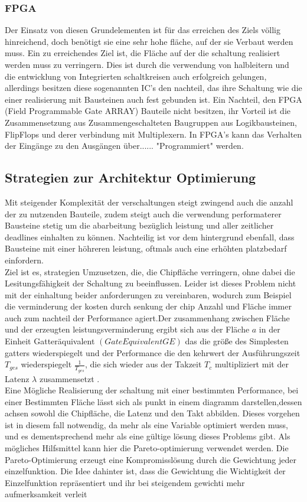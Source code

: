 \documentclass[conference]{IEEEtran}
\begin{document}
\subsubsection{FPGA}
Der Einsatz von diesen Grundelementen ist für das erreichen des Ziels völlig hinreichend, doch benötigt sie eine sehr hohe fläche, auf der sie Verbaut werden muss. Ein zu erreichendes Ziel ist, die Fläche auf der die schaltung realisiert werden muss zu verringern. Dies ist durch die verwendung von halbleitern und die entwicklung von Integrierten schaltkreisen auch erfolgreich gelungen, allerdings besitzen diese sogenannten IC's den nachteil, das ihre Schaltung wie die einer realisierung mit Bausteinen auch fest gebunden ist. Ein Nachteil, den FPGA (Field Programmable Gate ARRAY) Bauteile nicht besitzen, ihr Vorteil ist die Zusammensetzung aus Zusammengeschalteten Baugruppen aus Logikbausteinen, FlipFlops und derer verbindung mit Multiplexern. In FPGA's kann das Verhalten der Eingänge zu den Ausgängen über{\color{red}...... }"Programmiert" werden.
\subsection{Strategien zur Architektur Optimierung}
Mit steigender Komplexität der verschaltungen steigt zwingend auch die anzahl der  zu nutzenden Bauteile, zudem steigt auch die verwendung performaterer Bausteine stetig um die abarbeitung bezüglich leistung und aller zeitlicher deadlines einhalten zu können. Nachteilig ist vor dem hintergrund ebenfall, dass Bausteine mit einer höhreren leistung, oftmals auch eine erhöhten platzbedarf einfordern\cite[S.327]{2}.\\
Ziel ist es, strategien Umzusetzen, die,  die Chipfläche verringern, ohne dabei die Lesitungsfähigkeit der Schaltung zu beeinflussen. Leider ist dieses Problem nicht mit der einhaltung beider anforderungen zu vereinbaren, wodurch zum Beispiel die verminderung der kosten durch senkung der chip Anzahl und Fläche immer auch zum nachteil der Performance agiert.Der zusammenhang zwischen Fläche und der erzeugten leistungsverminderung ergibt sich aus der Fläche $a$ in der Einheit Gatteräquivalent $(Gate Equivalent GE)$ das die größe des Simplesten gatters wiederspiegelt\cite[S.326]{2} und der Performance die den kehrwert der Ausführungszeit $T_{ges}$ wiederspiegelt $\frac{1}{T_{ges}}$, die sich wieder aus der Takzeit $T_c$ multipliziert mit der Latenz $\lambda$ zusammensetzt
\cite[S.325-326]{2}.\\
 Eine Mögliche Realisierung der schaltung mit einer bestimmten Performance, bei einer Bestimmten Fläche lässt sich als punkt in einem diagramm darstellen,dessen achsen sowohl die Chipfläche, die Latenz und den Takt abbilden\cite[S.326]{2}.
 Dieses vorgehen\cite{?} ist in diesem fall notwendig, da mehr als eine Variable optimiert werden muss, und es dementsprechend mehr als eine gültige lösung dieses Problems gibt. Als mögliches Hilfsmittel kann hier die Pareto-optimierung verwendet werden. Die Pareto-Optimierung erzeugt eine Kompromisslösung durch die Gewichtung jeder einzelfunktion. Die Idee dahinter ist, dass die Gewichtung die Wichtigkeit der Einzelfunktion repräsentiert und ihr bei steigendem gewichti mehr aufmerksamkeit verleit\cite[S.45]{4}
\end{document}

